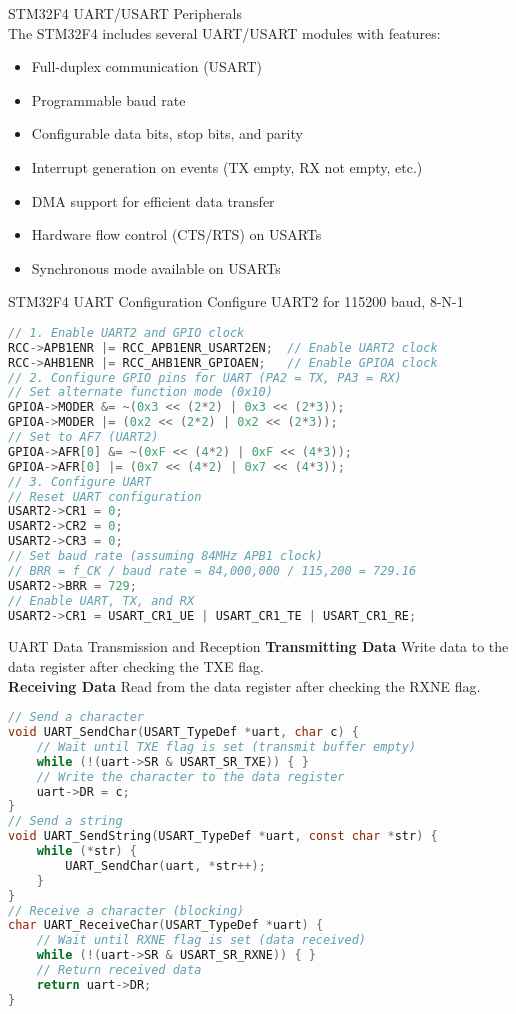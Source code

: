 \begin{concept}{STM32F4 UART/USART Peripherals}\\
The STM32F4 includes several UART/USART modules with features:
\begin{itemize}
    \item Full-duplex communication (USART)
    \item Programmable baud rate
    \item Configurable data bits, stop bits, and parity
    \item Interrupt generation on events (TX empty, RX not empty, etc.)
    \item DMA support for efficient data transfer
    \item Hardware flow control (CTS/RTS) on USARTs
    \item Synchronous mode available on USARTs
\end{itemize}
\end{concept}

\begin{code}{STM32F4 UART Configuration} Configure UART2 for 115200 baud, 8-N-1
\begin{lstlisting}[language=C, style=basesmol]
// 1. Enable UART2 and GPIO clock
RCC->APB1ENR |= RCC_APB1ENR_USART2EN;  // Enable UART2 clock
RCC->AHB1ENR |= RCC_AHB1ENR_GPIOAEN;   // Enable GPIOA clock
// 2. Configure GPIO pins for UART (PA2 = TX, PA3 = RX)
// Set alternate function mode (0x10)
GPIOA->MODER &= ~(0x3 << (2*2) | 0x3 << (2*3));
GPIOA->MODER |= (0x2 << (2*2) | 0x2 << (2*3));
// Set to AF7 (UART2)
GPIOA->AFR[0] &= ~(0xF << (4*2) | 0xF << (4*3));
GPIOA->AFR[0] |= (0x7 << (4*2) | 0x7 << (4*3));
// 3. Configure UART
// Reset UART configuration
USART2->CR1 = 0;
USART2->CR2 = 0;
USART2->CR3 = 0;
// Set baud rate (assuming 84MHz APB1 clock)
// BRR = f_CK / baud rate = 84,000,000 / 115,200 = 729.16
USART2->BRR = 729;
// Enable UART, TX, and RX
USART2->CR1 = USART_CR1_UE | USART_CR1_TE | USART_CR1_RE;
\end{lstlisting}
\end{code}

\begin{KR}{UART Data Transmission and Reception}
\textbf{Transmitting Data}
Write data to the data register after checking the TXE flag.\\
\textbf{Receiving Data}
Read from the data register after checking the RXNE flag.

\begin{lstlisting}[language=C, style=basesmol]
// Send a character
void UART_SendChar(USART_TypeDef *uart, char c) {
    // Wait until TXE flag is set (transmit buffer empty)
    while (!(uart->SR & USART_SR_TXE)) { }
    // Write the character to the data register
    uart->DR = c;
}
// Send a string
void UART_SendString(USART_TypeDef *uart, const char *str) {
    while (*str) {
        UART_SendChar(uart, *str++);
    }
}
// Receive a character (blocking)
char UART_ReceiveChar(USART_TypeDef *uart) {
    // Wait until RXNE flag is set (data received)
    while (!(uart->SR & USART_SR_RXNE)) { }
    // Return received data
    return uart->DR;
}
\end{lstlisting}
\end{KR}


